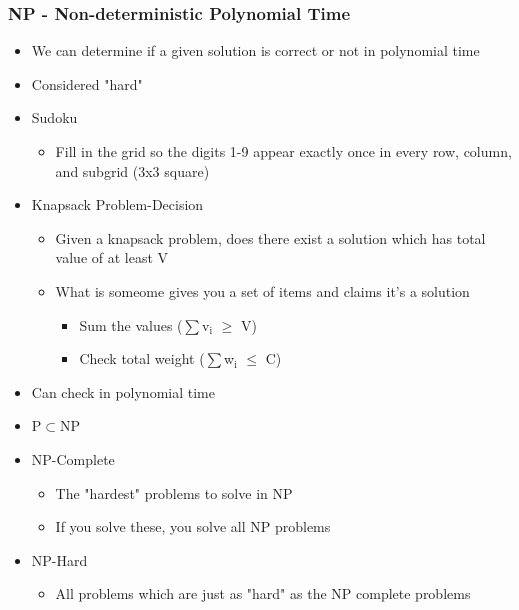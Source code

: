 \documentclass[11pt]{article}
\begin{document}
\subsubsection*{NP - Non-deterministic Polynomial Time}
\label{sec:org14c3b2a}
\begin{itemize}
\item We can determine if a given solution is correct or not in polynomial time
\item Considered "hard"
\item Sudoku
\begin{itemize}
\item Fill in the grid so the digits 1-9 appear exactly once in every row, column, and subgrid (3x3 square)
\end{itemize}
\item Knapsack Problem-Decision
\begin{itemize}
\item Given a knapsack problem, does there exist a solution which has total value of at least V
\item What is someome gives you a set of items and claims it's a solution
\begin{itemize}
\item Sum the values (\(\sum\)v\(_{\text{i}}\) \(\ge\) V)
\item Check total weight (\(\sum\)w\(_{\text{i}}\) \(\le\) C)
\end{itemize}
\end{itemize}
\item Can check in polynomial time
\item P\(\subset\)NP
\end{itemize}
\begin{itemize}
\item NP-Complete
\label{sec:org5017125}
\begin{itemize}
\item The "hardest" problems to solve in NP
\item If you solve these, you solve all NP problems
\end{itemize}
\item NP-Hard
\label{sec:org1a3097b}
\begin{itemize}
\item All problems which are just as "hard" as the NP complete problems
\end{itemize}
\end{itemize}
\end{document}
